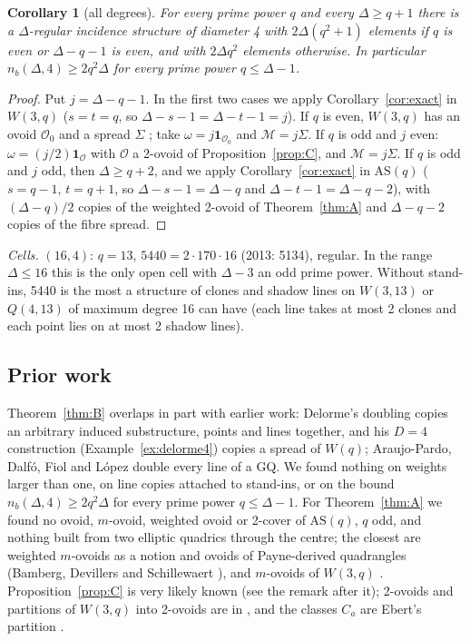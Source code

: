 \documentclass[11pt]{amsart}
\newtheorem{corollary}[theorem]{Corollary}
\theoremstyle{definition}
\theoremstyle{remark}
\numberwithin{equation}{section}
\newcommand{\AS}{\mathrm{AS}}
\newcommand{\nb}{n_b}
\newcommand{\cM}{\mathcal M}
\newcommand{\cO}{\mathcal O}
\begin{document}
\begin{corollary}[all degrees]\label{cor:B2}
For every prime power $q$ and every $\Delta\ge q+1$ there is a $\Delta$-regular incidence structure of diameter 4 with
$2\Delta(q^2+1)$ elements if $q$ is even or $\Delta-q-1$ is even, and with $2\Delta q^2$ elements otherwise. In particular
$\nb(\Delta,4)\ge2q^2\Delta$ for every prime power $q\le\Delta-1$.
\end{corollary}

\begin{proof}
Put $j=\Delta-q-1$. In the first two cases we apply Corollary~\ref{cor:exact} in $W(3,q)$ ($s=t=q$, so
$\Delta-s-1=\Delta-t-1=j$). If $q$ is even, $W(3,q)$ has an ovoid $\cO_0$ and a spread $\Sigma$ \cite[3.4.1]{PT}; take
$\omega=j\mathbf 1_{\cO_0}$ and $\cM=j\Sigma$. If $q$ is odd and $j$ even: $\omega=(j/2)\mathbf 1_\cO$ with $\cO$ a 2-ovoid of
Proposition~\ref{prop:C}, and $\cM=j\Sigma$. If $q$ is odd and $j$ odd, then $\Delta\ge q+2$, and we apply
Corollary~\ref{cor:exact} in $\AS(q)$ ($s=q-1$, $t=q+1$, so $\Delta-s-1=\Delta-q$ and $\Delta-t-1=\Delta-q-2$), with
$(\Delta-q)/2$ copies of the weighted 2-ovoid of Theorem~\ref{thm:A} and $\Delta-q-2$ copies of the fibre spread.
\end{proof}

\noindent\emph{Cells.} $(16,4)$: $q=13$, $5440=2\cdot170\cdot16$ (2013: 5134), regular. In the range $\Delta\le16$ this is
the only open cell with $\Delta-3$ an odd prime power. Without stand-ins, 5440 is the most a structure of clones and
shadow lines on $W(3,13)$ or $Q(4,13)$ of maximum degree 16 can have (each line takes at most 2 clones and each point
lies on at most 2 shadow lines).

\subsection{Prior work}
Theorem~\ref{thm:B} overlaps in part with earlier work: Delorme's doubling \cite[\S7]{D85a} copies an arbitrary induced
substructure, points and lines together, and his $D=4$ construction \cite[\S8(a)]{D85a} (Example~\ref{ex:delorme4}) copies a
spread of $W(q)$; Araujo-Pardo, Dalf\'o, Fiol and L\'opez \cite[Sec.~4]{ADFL21} double every line of a GQ. We found nothing
on weights larger than one, on line copies attached to stand-ins, or on the bound $\nb(\Delta,4)\ge2q^2\Delta$ for every
prime power $q\le\Delta-1$. For Theorem~\ref{thm:A} we found no ovoid, $m$-ovoid, weighted ovoid or 2-cover of $\AS(q)$,
$q$ odd, and nothing built from two elliptic quadrics through the centre; the closest are weighted $m$-ovoids as a notion
and ovoids of Payne-derived quadrangles (Bamberg, Devillers and Schillewaert \cite[\S7]{BDS12}), and $m$-ovoids of $W(3,q)$
\cite{BLP09,CCEM08}. Proposition~\ref{prop:C} is very likely known (see the remark after it); 2-ovoids and partitions of
$W(3,q)$ into 2-ovoids are in \cite{BLP09,FWX19,CCEM08}, and the classes $C_a$ are Ebert's partition \cite{E85}.
\end{document}

